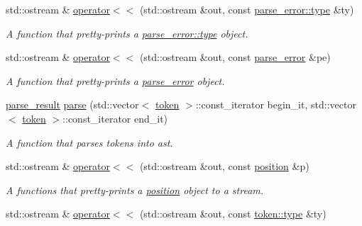 \begin{DoxyCompactItemize}
std\+::ostream \& \hyperlink{namespacebfjit_ae336474650e07d599dae9e197f7565a2}{operator$<$$<$} (std\+::ostream \&out, const \hyperlink{classbfjit_1_1parse__error_af750138d196890dcdc543c9fb1b7705b}{parse\+\_\+error\+::type} \&ty)
\begin{DoxyCompactList}\small\item\em A function that pretty-\/prints a \hyperlink{classbfjit_1_1parse__error_af750138d196890dcdc543c9fb1b7705b}{parse\+\_\+error\+::type} object. \end{DoxyCompactList}\item 
\hypertarget{namespacebfjit_a06209a97706aaee7244404eabb4a1399}{}\label{namespacebfjit_a06209a97706aaee7244404eabb4a1399} 
std\+::ostream \& \hyperlink{namespacebfjit_a06209a97706aaee7244404eabb4a1399}{operator$<$$<$} (std\+::ostream \&out, const \hyperlink{classbfjit_1_1parse__error}{parse\+\_\+error} \&pe)
\begin{DoxyCompactList}\small\item\em A function that pretty-\/prints a \hyperlink{classbfjit_1_1parse__error}{parse\+\_\+error} object. \end{DoxyCompactList}\item 
\hyperlink{namespacebfjit_ac770ef0753b4d7d6bd5800262ba97f25}{parse\+\_\+result} \hyperlink{namespacebfjit_add88f8f5cb8f1e6fe6d1ab62b2d5b9b4}{parse} (std\+::vector$<$ \hyperlink{classbfjit_1_1token}{token} $>$\+::const\+\_\+iterator begin\+\_\+it, std\+::vector$<$ \hyperlink{classbfjit_1_1token}{token} $>$\+::const\+\_\+iterator end\+\_\+it)
\begin{DoxyCompactList}\small\item\em A function that parses tokens into ast. \end{DoxyCompactList}\item 
\hypertarget{namespacebfjit_a339fdcb6eed0bc209bbf18598cbd4084}{}\label{namespacebfjit_a339fdcb6eed0bc209bbf18598cbd4084} 
std\+::ostream \& \hyperlink{namespacebfjit_a339fdcb6eed0bc209bbf18598cbd4084}{operator$<$$<$} (std\+::ostream \&out, const \hyperlink{classbfjit_1_1position}{position} \&p)
\begin{DoxyCompactList}\small\item\em A functions that pretty-\/prints a \hyperlink{classbfjit_1_1position}{position} object to a stream. \end{DoxyCompactList}\item 
\hypertarget{namespacebfjit_a5d7d8fa478e49f0143fc57fc6e28ffba}{}\label{namespacebfjit_a5d7d8fa478e49f0143fc57fc6e28ffba} 
std\+::ostream \& \hyperlink{namespacebfjit_a5d7d8fa478e49f0143fc57fc6e28ffba}{operator$<$$<$} (std\+::ostream \&out, const \hyperlink{classbfjit_1_1token_a2486a3e583fb48f3863c4eb5c32cdd96}{token\+::type} \&ty)

\end{DoxyCompactItemize}

